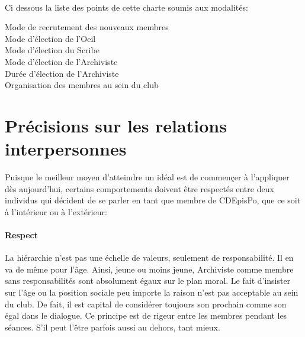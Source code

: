 \documentclass[a4paper,12pt]{article}
\begin{document}
\paragraph{}
Ci dessous la liste des points de cette charte soumis aux modalités:
\begin{description}
 \item [Mode de recrutement des nouveaux membres]
 \item [Mode d'élection de l'Oeil]
 \item [Mode d'élection du Scribe]
 \item [Mode d'élection de l'Archiviste]
 \item [Durée d'élection de l'Archiviste]
 \item [Organisation des membres au sein du club]
\end{description}


\section{Précisions sur les relations interpersonnes}
Puisque le meilleur moyen d'atteindre un idéal est de commençer à l'appliquer dès aujourd'hui, certains comportements doivent être respectés entre deux individus qui décident de se parler en tant que membre de CDEpisPo, que ce soit à l'intérieur ou à l'extérieur:
\paragraph{Respect}
La hiérarchie n'est pas une échelle de valeurs, seulement de responsabilité. Il en va de même pour l'âge. Ainsi, jeune ou moins jeune, Archiviste comme membre sans responsabilités sont absolument égaux sur le plan moral. Le fait d'insister sur l'âge ou la position sociale peu importe la raison n'est pas acceptable au sein du club. De fait, il est capital de considérer toujours son prochain comme son égal dans le dialogue. Ce principe est de rigeur entre les membres pendant les séances. S'il peut l'être parfois aussi au dehors, tant mieux.
\end{document}
